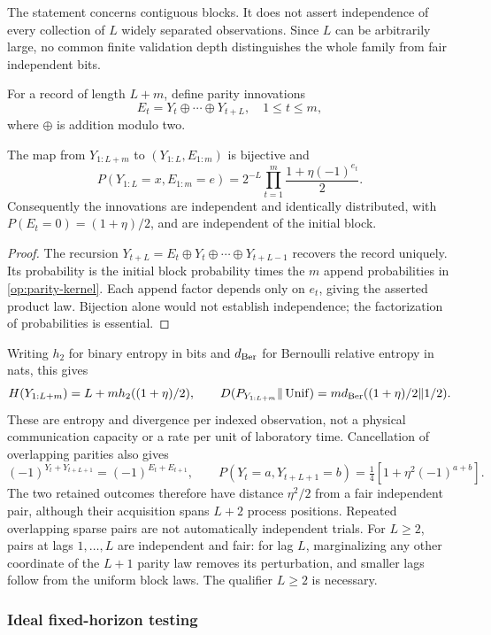 The statement concerns contiguous blocks.  It does not assert independence
of every collection of \(L\) widely separated observations.  Since \(L\)
can be arbitrarily large, no common finite validation depth distinguishes
the whole family from fair independent bits.

For a record of length \(L+m\), define parity innovations
\[
 E_t=Y_t\mathbin{\oplus}\cdots\mathbin{\oplus}Y_{t+L},
 \quad 1\le t\le m,
\]
where \(\oplus\) is addition modulo two.

\begin{theorem}\label{op:innovations}
The map from \(Y_{1:L+m}\) to \((Y_{1:L},E_{1:m})\) is bijective and
\[
 P(Y_{1:L}=x,E_{1:m}=e)
 =2^{-L}\prod_{t=1}^m\frac{1+\eta(-1)^{e_t}}2.
\]
Consequently the innovations are independent and identically distributed,
with \(P(E_t=0)=(1+\eta)/2\), and are independent of the initial block.
\end{theorem}
\begin{proof}
The recursion
\(Y_{t+L}=E_t\oplus Y_t\oplus\cdots\oplus Y_{t+L-1}\)
recovers the record uniquely.  Its probability is the initial block
probability times the \(m\) append probabilities in
\eqref{op:parity-kernel}.  Each append factor depends only on \(e_t\),
giving the asserted product law.  Bijection alone would not establish
independence; the factorization of probabilities is essential.
\end{proof}

Writing \(h_2\) for binary entropy in bits and \(d_{\rm Ber}\) for
Bernoulli relative entropy in nats, this gives
\[
 H(Y_{1:L+m})=L+m h_2((1+\eta)/2),\qquad
 D(P_{Y_{1:L+m}}\Vert\operatorname{Unif})=
 m d_{\rm Ber}((1+\eta)/2\Vert1/2).
\]
These are entropy and divergence per indexed observation, not a physical
communication capacity or a rate per unit of laboratory time.
Cancellation of overlapping parities also gives
\[
 (-1)^{Y_t+Y_{t+L+1}}=(-1)^{E_t+E_{t+1}},\qquad
 P(Y_t=a,Y_{t+L+1}=b)=\tfrac14[1+\eta^2(-1)^{a+b}].
\]
The two retained outcomes therefore have distance \(\eta^2/2\) from a
fair independent pair, although their acquisition spans \(L+2\) process
positions.  Repeated overlapping sparse pairs are not automatically
independent trials.
For \(L\ge2\), pairs at lags \(1,\ldots,L\) are independent and fair:
for lag \(L\), marginalizing any other coordinate of the \(L+1\) parity
law removes its perturbation, and smaller lags follow from the uniform
block laws.  The qualifier \(L\ge2\) is necessary.

\subsubsection{Ideal fixed-horizon testing}

